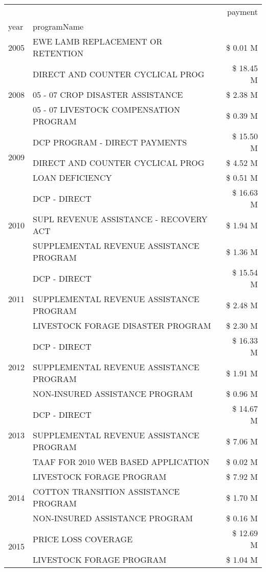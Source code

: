 \begin{tabular}{llr}
\toprule
 &  & payment \\
year & programName &  \\
\midrule
2005 & EWE LAMB REPLACEMENT OR RETENTION & \$ 0.01 M \\
\cline{1-3}
\multirow[t]{3}{*}{2008} & DIRECT AND COUNTER CYCLICAL PROG & \$ 18.45 M \\
 & 05 - 07 CROP DISASTER ASSISTANCE & \$ 2.38 M \\
 & 05 - 07 LIVESTOCK COMPENSATION PROGRAM & \$ 0.39 M \\
\cline{1-3}
\multirow[t]{3}{*}{2009} & DCP PROGRAM - DIRECT PAYMENTS & \$ 15.50 M \\
 & DIRECT AND COUNTER CYCLICAL PROG & \$ 4.52 M \\
 & LOAN DEFICIENCY & \$ 0.51 M \\
\cline{1-3}
\multirow[t]{3}{*}{2010} & DCP - DIRECT & \$ 16.63 M \\
 & SUPL REVENUE ASSISTANCE - RECOVERY ACT & \$ 1.94 M \\
 & SUPPLEMENTAL REVENUE ASSISTANCE PROGRAM & \$ 1.36 M \\
\cline{1-3}
\multirow[t]{3}{*}{2011} & DCP - DIRECT & \$ 15.54 M \\
 & SUPPLEMENTAL REVENUE ASSISTANCE PROGRAM & \$ 2.48 M \\
 & LIVESTOCK FORAGE DISASTER PROGRAM & \$ 2.30 M \\
\cline{1-3}
\multirow[t]{3}{*}{2012} & DCP - DIRECT & \$ 16.33 M \\
 & SUPPLEMENTAL REVENUE ASSISTANCE PROGRAM & \$ 1.91 M \\
 & NON-INSURED ASSISTANCE PROGRAM & \$ 0.96 M \\
\cline{1-3}
\multirow[t]{3}{*}{2013} & DCP - DIRECT & \$ 14.67 M \\
 & SUPPLEMENTAL REVENUE ASSISTANCE PROGRAM & \$ 7.06 M \\
 & TAAF FOR 2010 WEB BASED APPLICATION & \$ 0.02 M \\
\cline{1-3}
\multirow[t]{3}{*}{2014} & LIVESTOCK FORAGE PROGRAM & \$ 7.92 M \\
 & COTTON TRANSITION ASSISTANCE PROGRAM & \$ 1.70 M \\
 & NON-INSURED ASSISTANCE PROGRAM & \$ 0.16 M \\
\cline{1-3}
\multirow[t]{3}{*}{2015} & PRICE LOSS COVERAGE & \$ 12.69 M \\
 & LIVESTOCK FORAGE PROGRAM & \$ 1.04 M \\

\end{tabular}
